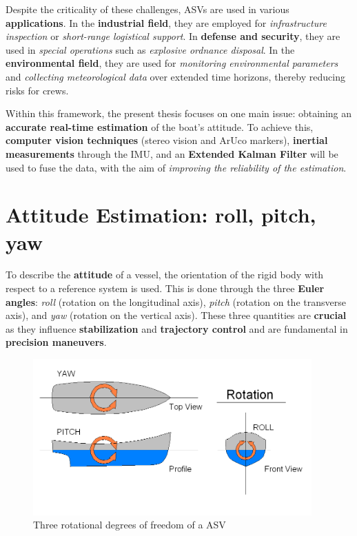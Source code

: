 Despite the criticality of these challenges, ASVs are used in various \textbf{applications}. In the \textbf{industrial field}, they are employed for \textit{infrastructure inspection} or \textit{short-range logistical support}. In \textbf{defense and security}, they are used in \textit{special operations} such as \textit{explosive ordnance disposal}. In the \textbf{environmental field}, they are used for \textit{monitoring environmental parameters} and \textit{collecting meteorological data} over extended time horizons, thereby reducing risks for crews.

Within this framework, the present thesis focuses on one main issue: obtaining an \textbf{accurate real-time estimation} of the boat’s attitude. To achieve this, \textbf{computer vision techniques} (stereo vision and ArUco markers), \textbf{inertial measurements} through the IMU, and an \textbf{Extended Kalman Filter} will be used to fuse the data, with the aim of \textit{improving the reliability of the estimation}.

\section{Attitude Estimation: roll, pitch, yaw}

To describe the \textbf{attitude} of a vessel, the orientation of the rigid body with respect to a reference system is used. This is done through the three \textbf{Euler angles}\cite{Euler_angles}: \textit{roll} (rotation on the longitudinal axis), \textit{pitch} (rotation on the transverse axis), and \textit{yaw} (rotation on the vertical axis). These three quantities are \textbf{crucial} as they influence \textbf{stabilization} and \textbf{trajectory control} and are fundamental in \textbf{precision maneuvers}.  

\begin{figure}[ht]
  \centering
  \includegraphics[height=6cm]{images/euler_angles.png}
  \caption{Three rotational degrees of freedom of a ASV}\label{unipd-logo}
\end{figure}


